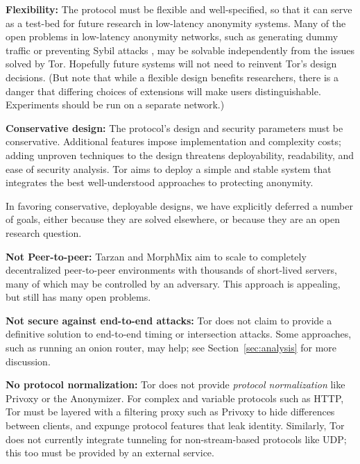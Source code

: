 \documentclass[times,10pt,twocolumn]{article}
\begin{document}
\textbf{Flexibility:} The protocol must be flexible and well-specified,
so that it can serve as a test-bed for future research in low-latency
anonymity systems.  Many of the open problems in low-latency anonymity
networks, such as generating dummy traffic or preventing Sybil attacks
\cite{sybil}, may be solvable independently from the issues solved by
Tor. Hopefully future systems will not need to reinvent Tor's design
decisions.  (But note that while a flexible design benefits researchers,
there is a danger that differing choices of extensions will make users
distinguishable. Experiments should be run on a separate network.)

\textbf{Conservative design:} The protocol's design and security
parameters must be conservative. Additional features impose implementation
and complexity costs; adding unproven techniques to the design threatens
deployability, readability, and ease of security analysis. Tor aims to
deploy a simple and stable system that integrates the best well-understood
approaches to protecting anonymity.

\label{subsec:non-goals}
In favoring conservative, deployable designs, we have explicitly deferred
a number of goals, either because they are solved elsewhere, or because
they are an open research question.

\textbf{Not Peer-to-peer:} Tarzan and MorphMix aim to scale to completely
decentralized peer-to-peer environments with thousands of short-lived
servers, many of which may be controlled by an adversary.  This approach
is appealing, but still has many open problems.

\textbf{Not secure against end-to-end attacks:} Tor does not claim
to provide a definitive solution to end-to-end timing or intersection
attacks. Some approaches, such as running an onion router, may help;
see Section~\ref{sec:analysis} for more discussion.

\textbf{No protocol normalization:} Tor does not provide \emph{protocol
normalization} like Privoxy or the Anonymizer. For complex and variable
protocols such as HTTP, Tor must be layered with a filtering proxy such
as Privoxy to hide differences between clients, and expunge protocol
features that leak identity. Similarly, Tor does not currently integrate
tunneling for non-stream-based protocols like UDP; this too must be
provided by an external service.
\end{document}
